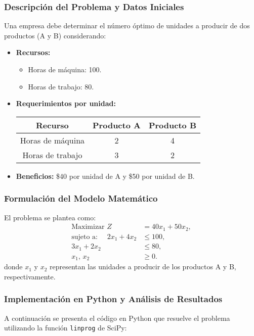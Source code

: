 	\subsubsection{Descripción del Problema y Datos Iniciales}
	Una empresa debe determinar el número óptimo de unidades a producir de dos productos (A y B) considerando:
	\begin{itemize}
		\item \textbf{Recursos:} 
		\begin{itemize}
			\item Horas de máquina: 100.
			\item Horas de trabajo: 80.
		\end{itemize}
		\item \textbf{Requerimientos por unidad:}
		\begin{center}
			\begin{tabular}{|c|c|c|}
				\hline
				\textbf{Recurso} & \textbf{Producto A} & \textbf{Producto B} \\
				\hline
				Horas de máquina & 2 & 4 \\
				Horas de trabajo & 3 & 2 \\
				\hline
			\end{tabular}
		\end{center}
		\item \textbf{Beneficios:} \$40 por unidad de A y \$50 por unidad de B.
	\end{itemize}
	
	\subsubsection{Formulación del Modelo Matemático}
	El problema se plantea como:
	\[
	\begin{aligned}
		\text{Maximizar } Z &= 40x_1 + 50x_2,\\[1mm]
		\text{sujeto a: } \quad 2x_1 + 4x_2 &\leq 100,\\[1mm]
		3x_1 + 2x_2 &\leq 80,\\[1mm]
		x_1,\, x_2 &\geq 0.
	\end{aligned}
	\]
	donde \(x_1\) y \(x_2\) representan las unidades a producir de los productos A y B, respectivamente.
	
	\subsubsection{Implementación en Python y Análisis de Resultados}
	A continuación se presenta el código en Python que resuelve el problema utilizando la función \verb|linprog| de SciPy:
	
